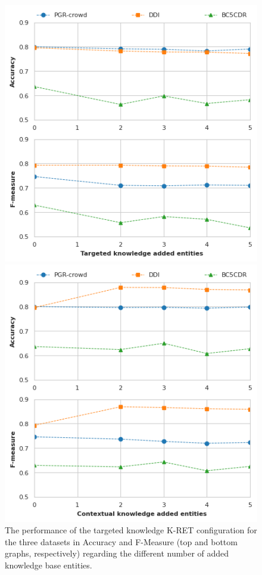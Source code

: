 \begin{figure}[H]
\centering
\begin{minipage}{0.48\textwidth}
\centering
\includegraphics[width=0.97\linewidth]{images/chapter_5/tk.png}
\caption[K-RET Performance of the Targeted Knowledge Configuration]{The performance of the targeted knowledge K-RET configuration for the three datasets in Accuracy and F-Measure (top and bottom graphs, respectively) regarding the different number of added knowledge base entities.}\label{fig:54}
\end{minipage}
\hfill
\begin{minipage}{0.48\textwidth}
\centering
\includegraphics[width=0.97\linewidth]{images/chapter_5/ck.png}

\end{minipage}
\end{figure}
